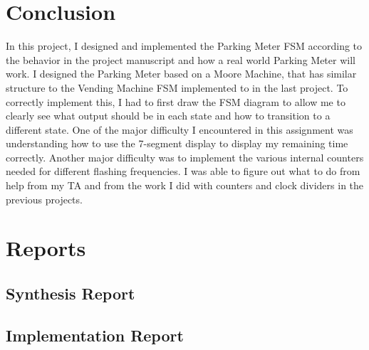 \documentclass{article}
\begin{document}
\section{Conclusion} 
In this project, I designed and implemented the Parking Meter FSM according to the behavior in the project manuscript and how a real world Parking Meter will work. I designed the Parking Meter based on a Moore Machine, that has similar structure to the Vending Machine FSM implemented to in the last project. To correctly implement this, I had to first draw the FSM diagram to allow me to clearly see what output should be in each state and how to transition to a different state. One of the major difficulty I encountered in this assignment was understanding how to use the 7-segment display to display my remaining time correctly. Another major difficulty was to implement the various internal counters needed for different flashing frequencies. I was able to figure out what to do from help from my TA and from the work I did with counters and clock dividers in the previous projects. 

\newpage
\small
\section{Reports}
\subsection{Synthesis Report}

\newpage
\subsection{Implementation Report}

\end{document}
